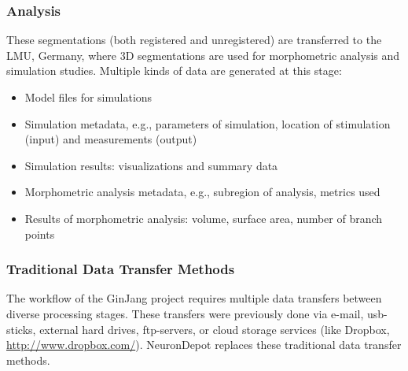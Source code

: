 \documentclass{frontiersSCNS} %
\begin{document}
\subsubsection{Analysis}

These segmentations (both registered and unregistered) are transferred to the
LMU, Germany, where 3D segmentations are used for morphometric analysis and
simulation studies. Multiple kinds of data are generated at this
stage:

\begin{itemize}
\item Model files for simulations
\item Simulation metadata, e.g., parameters of simulation, location of
    stimulation (input) and measurements (output)
\item Simulation results: visualizations and summary data
\item Morphometric analysis metadata, e.g., subregion of analysis, metrics used
\item Results of morphometric analysis: volume, surface area, number of branch points
\end{itemize}


\subsubsection{Traditional Data Transfer Methods}

The workflow of the GinJang project requires multiple data transfers between
diverse processing stages. These transfers were previously done via e-mail,
usb-sticks, external hard drives, ftp-servers, or cloud storage services (like
Dropbox, \url{http://www.dropbox.com/}). NeuronDepot replaces these traditional data transfer methods.


\end{document}
